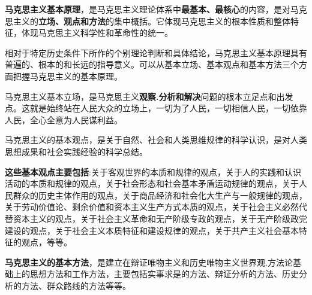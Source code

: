 {\textbf{马克思主义基本原理}}，是马克思主义理论体系中\textbf{{最基本、最核心}}的内容，是对马克思主义的\textbf{{立场、观点和方法}}的集中概括。它体现马克思主义的{根本性质}和{整体特征}，体现马克思主义{{科学性和革命性的统一}}。

相对于特定历史条件下所作的个别理论判断和具体结论，马克思主义基本原理具有普遍的、根本的和长远的指导意义。可以从基本立场、基本观点和基本方法三个方面把握马克思主义的基本原理。

{马克思主义基本立场}，是马克思主义\textbf{{观察.分析和解决}}问题的根本{立足点}和{出发点}。这就是始终站在人民大众的立场上，一切为了人民，一切相信人民，一切依靠人民，全心全意为人民谋利益。

{马克思主义的基本观点，是关于自然、社会和人类思维规律的科学认识，是对人类思想成果和社会实践经验的科学总结}。

{\textbf{这些基本观点主要包括}}:关于客观世界的本质和规律的观点，关于人的实践和认识活动的本质和规律的观点，关于社会形态和社会基本矛盾运动规律的观点，关于人民群众的历史主体作用的观点，关于商品经济和社会化大生产与一般规律的观点，关于劳动价值论、剩余价值和资本主义生产方式本质的观点，关于社会主义必然代替资本主义的观点，关于社会主义革命和无产阶级专政的观点，关于无产阶级政党建设的观点，关于社会主义本质特征和建设规律的观点，关于共产主义社会基本特征的观点，等等。

{\textbf{马克思主义的基本方法}}，是建立在辩证唯物主义和历史唯物主义世界观.方法论基础上的思想方法和工作方法，主要包括实事求是的方法、辩证分析的方法、历史分析的方法、群众路线的方法等等。
